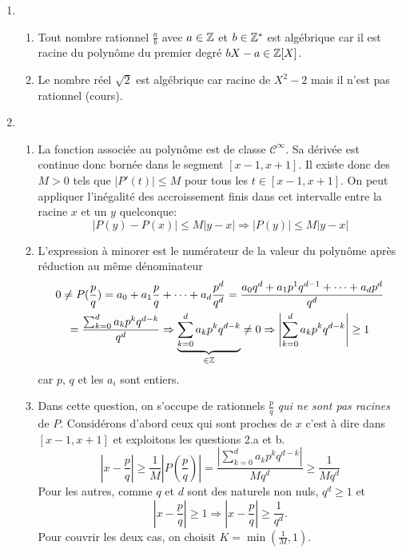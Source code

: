 \begin{enumerate}
  \item 
\begin{enumerate}
  \item Tout nombre rationnel $\frac{a}{b}$ avec $a\in\mathbb{Z}$ et $b\in \mathbb{Z}^*$ est algébrique car il est racine du polynôme du premier  degré $bX -a \in \mathbb{Z}[X]$. 
  \item Le nombre réel $\sqrt{2}$ est algébrique car racine de $X^2 - 2$ mais il n'est pas rationnel (cours).
\end{enumerate}

  \item
\begin{enumerate}
  \item La fonction associée au polynôme est de classe $\mathcal{C}^{\infty}$. Sa dérivée est continue donc bornée dans le segment $[x-1,x+1]$. Il existe donc des $M>0$ tels que $|P'(t)|\leq M$ pour tous les $t\in [x-1,x+1]$. On peut appliquer l'inégalité des accroissement finis dans cet intervalle entre la racine $x$ et un $y$ quelconque:
\begin{displaymath}
  \left|P(y)-P(x)\right| \leq M\left|y-x\right| \Rightarrow \left|P(y)\right| \leq M\left|y-x\right|
\end{displaymath}

  \item L'expression à minorer est le numérateur de la valeur du polynôme après réduction au même dénominateur
\begin{multline*}
0\neq  P(\frac{p}{q}) = a_0+a_1\frac{p}{q}+\cdots + a_d\frac{p^d}{q^d}
= \frac{a_0q^d + a_1p^1q^{d-1} + \cdots + a_dp^d}{q^d}\\
  = \frac{\sum_{k=0}^{d}a_kp^kq^{d-k}}{q^d}
  \Rightarrow \underset{\in \mathbb{Z}}{\underbrace{\sum_{k=0}^{d}a_kp^kq^{d-k}}} \neq 0 \Rightarrow \left|\sum_{k=0}^{d}a_kp^kq^{d-k}\right| \geq 1
\end{multline*}
car $p$, $q$ et les $a_i$ sont entiers.
  \item Dans cette question, on s'occupe de rationnels $\frac{p}{q}$ \emph{qui ne sont pas racines } de $P$.\newline
Considérons d'abord ceux qui sont proches de $x$ c'est à dire dans $[x-1, x+1]$ et exploitons les questions 2.a et b.
\begin{displaymath}
\left|x - \frac{p}{q}\right| \geq \frac{1}{M}\left|P(\frac{p}{q})\right| =\frac{\left|\sum_{k=0}^{d}a_kp^kq^{d-k}\right|}{M q^d} \geq \frac{1}{Mq^d}
\end{displaymath}
Pour les autres, comme $q$ et $d$ sont des naturels non nuls, $q^d\geq 1$ et
\begin{displaymath}
  |x-\frac{p}{q}|\geq 1 \Rightarrow |x-\frac{p}{q}|\geq \frac{1}{q^d}.
\end{displaymath}
Pour couvrir les deux cas, on choisit $K = \min(\frac{1}{M},1)$.
\end{enumerate}


\end{enumerate}
